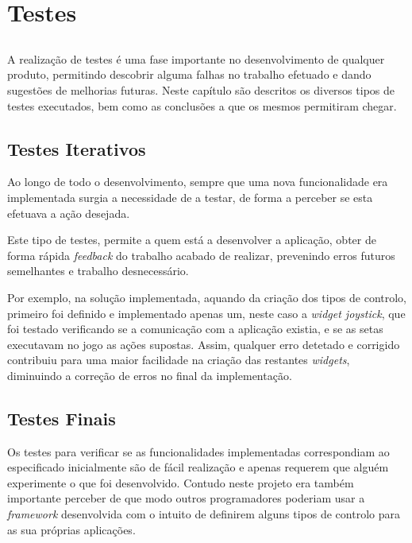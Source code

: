 \chapter{Testes} \label{chap:testes}

\section*{}

A realização de testes é uma fase importante no desenvolvimento de qualquer produto, permitindo descobrir alguma falhas no trabalho efetuado e dando sugestões de melhorias futuras.
Neste capítulo são descritos os diversos tipos de testes executados, bem como as conclusões a que os mesmos permitiram chegar.

\section{Testes Iterativos}

	Ao longo de todo o desenvolvimento, sempre que uma nova funcionalidade era implementada surgia a necessidade de a testar, de forma a perceber se esta efetuava a ação desejada.

	Este tipo de testes, permite a quem está a desenvolver a aplicação, obter de forma rápida \textit{feedback} do trabalho acabado de realizar, prevenindo erros futuros semelhantes e trabalho desnecessário.

	Por exemplo, na solução implementada, aquando da criação dos tipos de controlo, primeiro foi definido e implementado apenas um, neste caso a \textit{widget joystick}, que foi testado verificando se a comunicação com a aplicação existia, e se as setas executavam no jogo as ações supostas. Assim, qualquer erro detetado e corrigido contribuiu para uma maior facilidade na criação das restantes \textit{widgets}, diminuindo a correção de erros no final da implementação.


\section{Testes Finais}
	
	Os testes para verificar se as funcionalidades implementadas correspondiam ao especificado inicialmente são de fácil realização e apenas requerem que alguém experimente o que foi desenvolvido. Contudo neste projeto era também importante perceber de que modo outros programadores poderiam usar a \textit{framework} desenvolvida com o intuito de definirem alguns tipos de controlo para as sua próprias aplicações.

